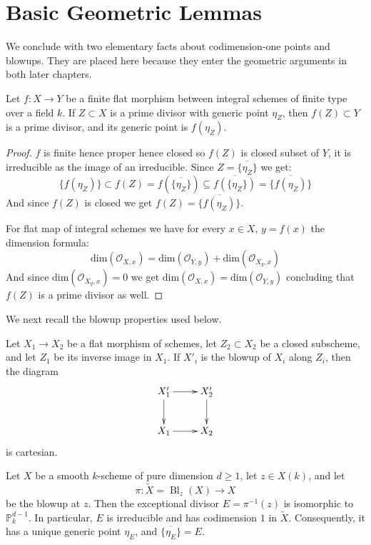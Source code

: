 \section{Basic Geometric Lemmas}

We conclude with two elementary facts about codimension-one points and
blowups. They are placed here because they enter the geometric arguments in
both later chapters.

\begin{prop}\label{prop:finite_flat_prime_divisor}
Let $f:X\to Y$ be a finite flat morphism between integral schemes of finite
type over a field $k$. If $Z\subset X$ is a prime divisor with generic point
$\eta_Z$, then $f(Z)\subset Y$ is a prime divisor, and its generic point is
$f(\eta_Z)$.
\end{prop}

\begin{proof}
    $f$ is finite hence proper hence closed so $f(Z)$ is closed subset of $Y$, it is irreducible as the image of an irreducible.
    Since $Z = \overline{\{ \eta_Z \}}$ we get:
    $$\{f(\eta_Z)\} \subset f(Z) = f(\overline{\{\eta_Z\}}) \subseteq \overline{f(\{\eta_Z\})} = \overline{\{f(\eta_Z)\}}$$
    And since $f(Z)$ is closed we get $f(Z) = \overline{\{f(\eta_Z)\}}$.

    For flat map of integral schemes we have for every $x \in X$, $y=f(x)$ the dimension formula:
    $$\text{dim}(\mathcal{O}_{X,x}) = \text{dim}(\mathcal{O}_{Y,y}) + \text{dim}(\mathcal{O}_{X_y, x})$$
    And since $\text{dim}(\mathcal{O}_{X_y, x}) = 0$ we get $\text{dim}(\mathcal{O}_{X,x}) = \text{dim}(\mathcal{O}_{Y,y})$
    concluding that $f(Z)$ is a prime divisor as well.
\end{proof}

We next recall the blowup properties used below.

\begin{theorem}[\stackstag{0805}]\label{theorem:blowup_flat_base_change}
Let $X_1\to X_2$ be a flat morphism of schemes, let $Z_2\subset X_2$ be a
closed subscheme, and let $Z_1$ be its inverse image in $X_1$. If $X'_i$ is
the blowup of $X_i$ along $Z_i$, then the diagram
\[
\xymatrix{
X'_1 \ar[r] \ar[d] & X'_2 \ar[d] \\
X_1 \ar[r] & X_2
}
\]
is cartesian.
\end{theorem}

\begin{prop}\label{prop:exceptional_divisor_smooth_point}
Let $X$ be a smooth $k$-scheme of pure dimension $d\geq 1$, let $z\in X(k)$, and
let
\[
\pi:\widetilde X=\operatorname{Bl}_z(X)\longrightarrow X
\]
be the blowup at $z$. Then the exceptional divisor
$E=\pi^{-1}(z)$ is isomorphic to $\mathbb P_k^{d-1}$. In particular, $E$ is
irreducible and has codimension $1$ in $\widetilde X$. Consequently, it has
a unique generic point $\eta_E$, and $\overline{\{\eta_E\}}=E$.
\end{prop}

